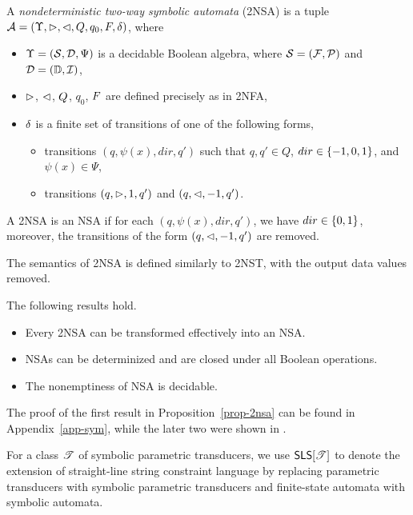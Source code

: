 \begin{definition}
    A \emph{nondeterministic two-way  symbolic \emph{automata}} (2NSA) is a tuple $\mathcal{A} = (\Upsilon, \vartriangleright, \vartriangleleft, Q, q_0, F, \delta)$, where  
\begin{itemize}
\item $\Upsilon=(\mathcal{S}, \mathcal{D}, \Psi)$ is a decidable Boolean algebra, where $\mathcal{S} = ({\mathcal{F}}, {\mathcal{P}})$ and $\mathcal{D} = (\mathbb{D}, \mathcal{I})$,
%
\item $\vartriangleright$, $\vartriangleleft$, $Q$, $q_0$, $F$ are defined precisely as in 2NFA, 
%
\item $\delta$ is a finite set of  transitions of one of the following forms,
\begin{itemize}
\item   transitions $(q, \psi(x), dir, q')$ such that $q, q' \in Q$, $dir \in \{-1, 0, 1\}$, and $\psi(x) \in \Psi$, 
%
\item   transitions $(q, \vartriangleright, 1, q')$ and $(q, \vartriangleleft, -1, q')$. 
\end{itemize}
\end{itemize}
A 2NSA is an NSA if for each $(q, \psi(x), dir, q')$, we have $dir \in \{0, 1\}$, moreover, the transitions of the form $(q, \vartriangleleft, -1, q')$ are removed.
\end{definition}

The semantics of 2NSA is defined similarly to 2NST, with the output data values removed.

\begin{proposition}\label{prop-2nsa}
The following results hold.
\begin{itemize}
\item Every 2NSA can be transformed effectively into an NSA.
%
\item NSAs can be determinized and are closed under all Boolean operations.
%
\item The nonemptiness of NSA is decidable.
\end{itemize}
\end{proposition}
The proof of the first result in Proposition~\ref{prop-2nsa} can be found in Appendix~\ref{app-sym}, while the later two were shown in \cite{NG01,DV14}.

For a class $\mathscr{T}$ of symbolic parametric transducers, we use $\textsf{SLS}[\mathscr{T}]$ to denote the extension of straight-line string constraint language by replacing parametric transducers with symbolic parametric transducers and finite-state automata with symbolic automata.

